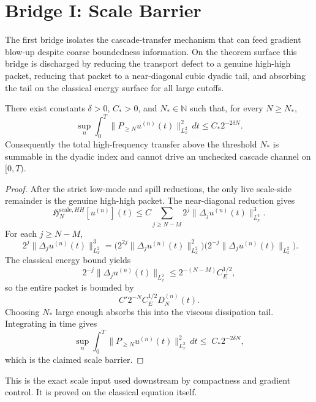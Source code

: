 \section{Bridge I: Scale Barrier}

The first bridge isolates the cascade-transfer mechanism that can feed gradient blow-up despite coarse boundedness information. On the theorem surface this bridge is discharged by reducing the transport defect to a genuine high-high packet, reducing that packet to a near-diagonal cubic dyadic tail, and absorbing the tail on the classical energy surface for all large cutoffs.

\begin{proposition}
\label{prop:scale-barrier}
There exist constants \(\delta>0\), \(C_\ast>0\), and \(N_\ast\in\mathbb{N}\) such that, for every \(N\ge N_\ast\),
\[
\sup_n \int_0^T \|P_{\ge N}u^{(n)}(t)\|_{L^2_x}^2\,dt \le C_\ast 2^{-2\delta N}.
\]
Consequently the total high-frequency transfer above the threshold \(N_\ast\) is summable in the dyadic index and cannot drive an unchecked cascade channel on \([0,T)\).
\end{proposition}

\begin{proof}
After the strict low-mode and spill reductions, the only live scale-side remainder is the genuine high-high packet. The near-diagonal reduction gives
\[
\mathfrak{H}^{\mathrm{scale},HH}_{N}[u^{(n)}](t)
\le
C\sum_{j\ge N-M}2^j\|\Delta_j u^{(n)}(t)\|_{L^2_x}^3.
\]
For each \(j\ge N-M\),
\[
\;2^j\|\Delta_j u^{(n)}(t)\|_{L^2_x}^3
=
\bigl(2^{2j}\|\Delta_j u^{(n)}(t)\|_{L^2_x}^2\bigr)
\bigl(2^{-j}\|\Delta_j u^{(n)}(t)\|_{L^2_x}\bigr).
\]
The classical energy bound yields
\[
2^{-j}\|\Delta_j u^{(n)}(t)\|_{L^2_x}\le 2^{-(N-M)}C_E^{1/2},
\]
so the entire packet is bounded by
\[
C'2^{-N}C_E^{1/2}D_N^{(n)}(t).
\]
Choosing \(N_\ast\) large enough absorbs this into the viscous dissipation tail. Integrating in time gives
\[
\sup_n \int_0^T \|P_{\ge N}u^{(n)}(t)\|_{L^2_x}^2\,dt
\le
\; C_\ast 2^{-2\delta N},
\]
which is the claimed scale barrier.
\end{proof}

This is the exact scale input used downstream by compactness and gradient control. It is proved on the classical equation itself.
